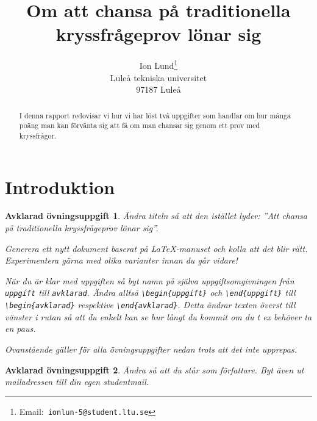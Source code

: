 \documentclass[12pt,a4wide]{article}
\title{Om att chansa på traditionella kryssfrågeprov lönar sig}  %
\author{Ion Lund\thanks{Email:~\texttt{ionlun-5@student.ltu.se}} \\
        Luleå tekniska universitet \\  %
        97187 Luleå}
\theoremstyle{uppgiftsstil}
\newcommand{\ovningstext}{Övningsuppgift}
\newtheorem{ovning}{\ovningstext}
\newenvironment{uppgift}{\begin{framed}\begin{ovning}}%
                        {\end{ovning}\end{framed}}
\theoremstyle{avklaradstil}
\newcommand{\avklaradtext}{Avklarad övningsuppgift}
\newtheorem{klar}[ovning]{\avklaradtext}
\newenvironment{avklarad}{\begin{framed}\begin{klar}}%
                         {\end{klar}\end{framed}}
\begin{document}

\maketitle               %

\begin{abstract}         %
  I denna rapport redovisar vi hur vi har löst två uppgifter
  som handlar om hur många poäng man kan förvänta sig att få om man
  chansar sig genom ett prov med kryssfrågor.
\end{abstract}

\section{Introduktion} %
\label{sec:intro} %

\begin{avklarad}
  Ändra titeln så att den istället lyder: ''Att chansa på
  traditionella kryssfrågeprov lönar sig''. 

  Generera ett nytt dokument baserat på \LaTeX-manuset och
  kolla att det blir rätt. Experimentera gärna med
  olika varianter innan du går vidare! 

  När du är klar med uppgiften så byt namn på själva
  uppgiftsomgivningen från \texttt{uppgift} till
  \texttt{avklarad}. Ändra alltså \verb|\begin{uppgift}| och
  \verb|\end{uppgift}| till \verb|\begin{avklarad}| respektive
  \verb|\end{avklarad}|. Detta ändrar texten överst till vänster i
  rutan så att du enkelt kan se hur långt du kommit om du t ex behöver
  ta en paus.   

  Ovanstående gäller för alla övningsuppgifter nedan trots att det
  inte upprepas. 
\end{avklarad}
%
\begin{avklarad}
  Ändra så att du står som författare. Byt även ut mailadressen
  till din egen studentmail. 
\end{avklarad}
\end{document}
